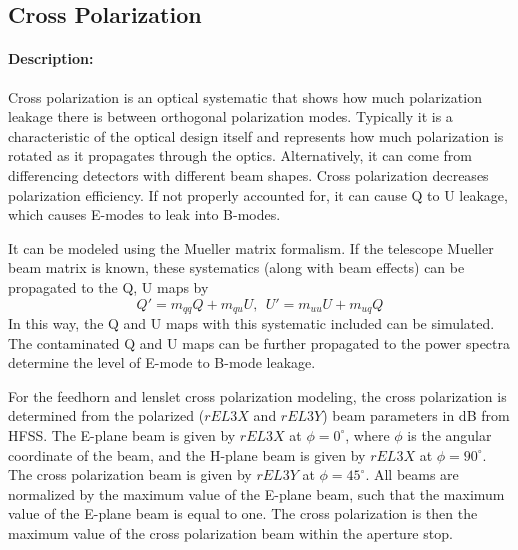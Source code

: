 
\subsection{Cross Polarization}

\paragraph{Description:}
Cross polarization is an optical systematic that shows how much polarization leakage there is between orthogonal polarization modes. Typically it is a characteristic of the optical design itself and represents how much polarization is rotated as it propagates through the optics. Alternatively, it can come from differencing detectors with different beam shapes. Cross polarization decreases polarization efficiency. If not properly accounted for, it can cause Q to U leakage, which causes E-modes to leak into B-modes.
 
It can be modeled using the Mueller matrix formalism. If the telescope Mueller beam matrix is known, these systematics (along with beam effects) can be propagated to the Q, U maps by
\begin{equation}
Q' = m_{qq} Q + m_{qu} U, \ \ U' = m_{uu} U + m_{uq} Q
\end{equation}
In this way, the Q and U maps with this systematic included can be simulated. The contaminated Q and U maps can be further propagated to the power spectra determine the level of E-mode to B-mode leakage.

For the feedhorn and lenslet cross polarization modeling, the cross polarization is determined from the polarized ($rEL3X$ and $rEL3Y$) beam parameters in dB from HFSS. The E-plane beam is given by $rEL3X$ at $\phi=0^{\circ}$, where $\phi$ is the angular coordinate of the beam, and the H-plane beam is given by $rEL3X$ at $\phi=90^{\circ}$. The cross polarization beam is given by $rEL3Y$ at $\phi=45^{\circ}$. All beams are normalized by the maximum value of the E-plane beam, such that the maximum value of the E-plane beam is equal to one. The cross polarization is then the maximum value of the cross polarization beam within the aperture stop.

